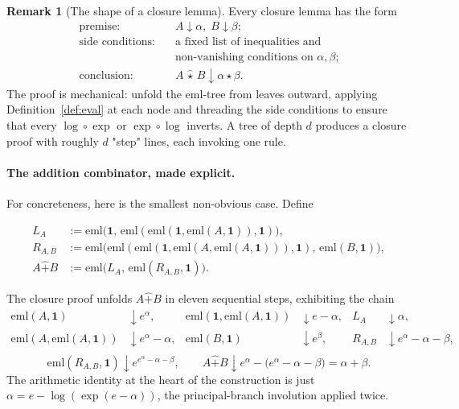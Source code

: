\documentclass[11pt]{article}
\newcommand{\hadd}{\mathbin{\widehat{+}}}
\theoremstyle{plain}
\theoremstyle{definition}
\newtheorem{remark}[theorem]{Remark}
\begin{document}
\begin{remark}[The shape of a closure lemma]
\label{rmk:closure}
Every closure lemma has the form
\[
  \begin{aligned}
   \text{premise:}\quad & A \downarrow \alpha,\; B \downarrow \beta;\\
   \text{side conditions:}\quad & \text{a fixed list of inequalities and}\\
   & \text{non-vanishing conditions on $\alpha,\beta$;}\\
   \text{conclusion:}\quad & A \,\widehat{\star}\, B \downarrow \alpha \star \beta.
  \end{aligned}
\]
The proof is mechanical: unfold the $\mathrm{eml}$-tree from leaves
outward, applying Definition~\ref{def:eval} at each node and threading
the side conditions to ensure that every $\log\circ\exp$ or
$\exp\circ\log$ inverts. A tree of depth $d$ produces a closure
proof with roughly $d$ "step" lines, each invoking one rule.
\end{remark}

\paragraph{The addition combinator, made explicit.}
For concreteness, here is the smallest non-obvious case. Define

\begin{align*}
  L_A &:= \mathrm{eml}\!\bigl(\mathbf{1},\,
   \mathrm{eml}(\mathrm{eml}(\mathbf{1},\mathrm{eml}(A,\mathbf{1})),\mathbf{1})\bigr), \\[2pt]
  R_{A,B} &:= \mathrm{eml}\!\bigl(
   \mathrm{eml}(\mathrm{eml}(\mathbf{1},\mathrm{eml}(A,\mathrm{eml}(A,\mathbf{1}))),\mathbf{1}),\,
   \mathrm{eml}(B,\mathbf{1})\bigr), \\[2pt]
  A \hadd B &:= \mathrm{eml}\!\bigl(L_A,\,\mathrm{eml}(R_{A,B},\mathbf{1})\bigr).
\end{align*}

The closure proof unfolds $A \hadd B$ in eleven sequential steps,
exhibiting the chain
\[
  \begin{aligned}
   \mathrm{eml}(A,\mathbf{1}) &\downarrow e^{\alpha}, &
   \mathrm{eml}(\mathbf{1},\mathrm{eml}(A,\mathbf{1})) &\downarrow e - \alpha, &
   L_A &\downarrow \alpha,\\
   \mathrm{eml}(A,\mathrm{eml}(A,\mathbf{1})) &\downarrow e^{\alpha} - \alpha, &
   \mathrm{eml}(B,\mathbf{1}) &\downarrow e^{\beta}, &
   R_{A,B} &\downarrow e^{\alpha} - \alpha - \beta,\\
  \end{aligned}
\]
\[
  \mathrm{eml}(R_{A,B},\mathbf{1})\downarrow e^{e^{\alpha}-\alpha-\beta},
  \qquad
  A \hadd B \downarrow e^{\alpha} - \bigl(e^{\alpha}-\alpha-\beta\bigr) = \alpha + \beta.
\]
The arithmetic identity at the heart of the construction is just
$\alpha = e - \log(\exp(e - \alpha))$, the principal-branch involution
applied twice.
\end{document}
